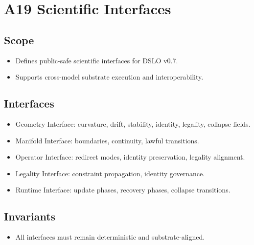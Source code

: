 \section{A19 Scientific Interfaces}

\subsection{Scope}
\begin{itemize}
    \item Defines public-safe scientific interfaces for DSLO v0.7.
    \item Supports cross-model substrate execution and interoperability.
\end{itemize}

\subsection{Interfaces}
\begin{itemize}
    \item Geometry Interface: curvature, drift, stability, identity, legality, collapse fields.
    \item Manifold Interface: boundaries, continuity, lawful transitions.
    \item Operator Interface: redirect modes, identity preservation, legality alignment.
    \item Legality Interface: constraint propagation, identity governance.
    \item Runtime Interface: update phases, recovery phases, collapse transitions.
\end{itemize}

\subsection{Invariants}
\begin{itemize}
    \item All interfaces must remain deterministic and substrate-aligned.
\end{itemize}
